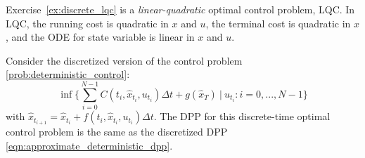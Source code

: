 \documentclass[11pt]{book}
\begin{document}
Exercise~\ref{ex:discrete_lqc} is a \emph{linear-quadratic} optimal control problem, LQC. In LQC, the running cost is quadratic in $x$ and $u$, the terminal cost is quadratic in $x$, and the ODE for state variable is linear in $x$ and $u$.

\begin{rem}
Consider the discretized version of the control problem \eqref{prob:deterministic_control}:
\begin{equation}
    \label{prob:discrete_deterministic_control}
    \inf\Big\{\sum_{i=0}^{N-1}C(t_i,\hat{x}_{t_i},u_{t_i}){{\Delta t}}+g(\hat{x}_{T})~|~{u_{t_i}:i=0,...,N-1}\Big\}
\end{equation}
with $\hat{x}_{t_{i+1}} = \hat{x}_{t_i} + f(t_i,\hat{x}_{t_i},u_{t_i}){\Delta t}$. The DPP for this discrete-time optimal control problem is the same as the discretized DPP \eqref{eqn:approximate_deterministic_dpp}.
\end{rem}
\end{document}
